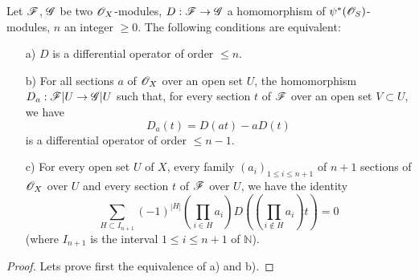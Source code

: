 \begin{proposition}[16.8.8]
\label{IV.16.8.8}
Let $\mathscr{F}$, $\mathscr{G}$ be two $\mathscr{O}_X$-modules, $D: \sh{F} \to \sh{G}$ a homomorphism of $\psi^*(\mathscr{O}_S)$-modules, $n$ an integer $\geq 0$.
The following conditions are equivalent:
\begin{enumerate}
  \item[a)] $D$ is a differential operator of order $\leq n$.
  \item[b)] For all sections $a$ of $\mathscr{O}_X$ over an open set $U$, the homomorphism $D_a: \sh{F}|U \to \sh{G}|U$ such that, for every section $t$ of $\mathscr{F}$ over an open set $V \subset U$, we have
  \[  
    \label{IV.16.8.8.1}
    D_a(t) = D(at) - a D(t)
    \tag{16.8.8.1}
  \]
  is a differential operator of order $\leq n-1$.
  \item[c)] For every open set $U$ of $X$, every family $(a_i)_{1 \leq i \leq n+1}$ of $n+1$ sections of $\mathscr{O}_X$ over $U$ and every section $t$ of $\mathscr{F}$ over $U$, we have the identity
  \[
    \label{IV.16.8.8.2}
    \sum_{H \subset I_{n+1}} (-1)^{|H|} (\prod_{i \in H} a_i) D ((\prod_{i \notin H} a_i ) t ) = 0
    \tag{16.8.8.2}
  \]
  (where $I_{n+1}$ is the interval $1 \leq i \leq n+1$ of $\mathbb{N}$).
\end{enumerate}
\end{proposition}

\begin{proof}
  Lets prove first the equivalence of a) and b).
\end{proof}